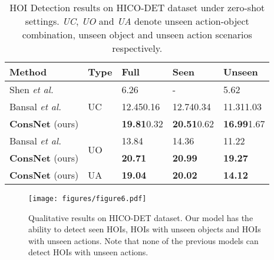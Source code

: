 \documentclass[sigconf,screen]{acmart}
\begin{document}
\begin{table}
\renewcommand\tabcolsep{4pt}
\newcommand{\beforefulloffset}{\hspace{-0.1cm}}
\newcommand{\beforeseenoffset}{\hspace{-0.6cm}}
\newcommand{\beforeunseenoffset}{\hspace{-1.1cm}}
\caption{HOI Detection results on HICO-DET dataset under zero-shot settings. \textit{UC}, \textit{UO} and \textit{UA} denote unseen action-object combination, unseen object and unseen action scenarios respectively.}
\label{tab:3}
\begin{tabularx}{\linewidth}{p{2.15cm}<{\raggedright}|p{0.7cm}<{\centering}|p{1.6cm}<{\centering}p{1.6cm}<{\centering}p{1.6cm}<{\centering}}
\toprule
\textbf{Method}&\textbf{Type}&\beforefulloffset\textbf{Full}&\beforeseenoffset\textbf{Seen}&\beforeunseenoffset\textbf{Unseen}\\
\midrule
Shen \textit{et al.} \cite{shen2018scaling}&\multirow{3}{*}{UC}&\beforefulloffset6.26&\beforeseenoffset-&\beforeunseenoffset5.62\\
Bansal \textit{et al.} \cite{bansal2019detecting}&&\beforefulloffset12.450.16&\beforeseenoffset12.740.34&\beforeunseenoffset11.311.03\\
\textbf{ConsNet} (ours)&&\beforefulloffset\textbf{19.81}0.32&\beforeseenoffset\textbf{20.51}0.62&\beforeunseenoffset\textbf{16.99}1.67\\
\midrule
Bansal \textit{et al.} \cite{bansal2019detecting}&\multirow{2}{*}{UO}&\beforefulloffset13.84&\beforeseenoffset14.36&\beforeunseenoffset11.22\\
\textbf{ConsNet} (ours)&&\beforefulloffset\textbf{20.71}&\beforeseenoffset\textbf{20.99}&\beforeunseenoffset\textbf{19.27}\\
\midrule
\textbf{ConsNet} (ours)&UA&\beforefulloffset\textbf{19.04}&\beforeseenoffset\textbf{20.02}&\beforeunseenoffset\textbf{14.12}\\
\bottomrule
\end{tabularx}
\end{table}

\begin{figure*}
\centering
\texttt{[image: figures/figure6.pdf]}
\caption{Qualitative results on HICO-DET dataset. Our model has the ability to detect seen HOIs, HOIs with unseen objects and HOIs with unseen actions. Note that none of the previous models can detect HOIs with unseen actions.}
\label{fig6}
\end{figure*}
\end{document}
